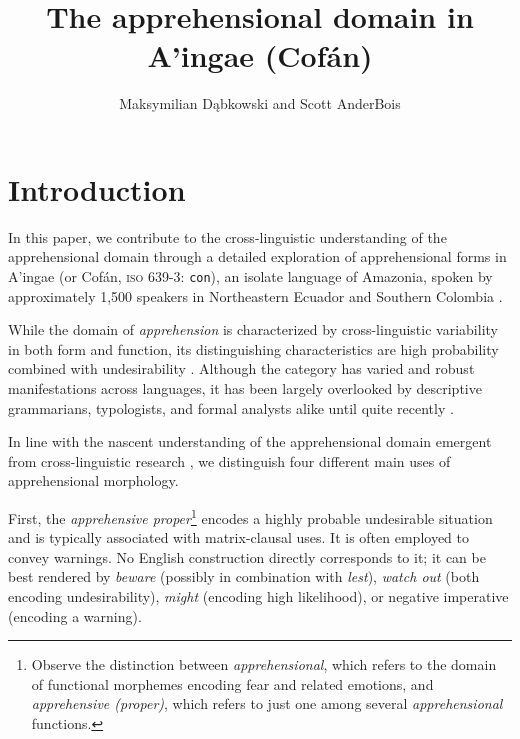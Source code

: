 \documentclass[output=paper,colorlinks,citecolor=brown]{langscibook}
\author{Maksymilian Dąbkowski\affiliation{University of California, Berkeley} and Scott AnderBois\affiliation{Brown University}}
\title{The apprehensional domain in A'ingae (Cofán)}
\begin{document}


\maketitle




\section{Introduction}
\label{sec:introduction}

In this paper, we contribute to the cross-linguistic understanding of the apprehensional domain through a detailed exploration of apprehensional forms in A'ingae (or Cofán, {\textsc{iso} 639-3}: \texttt{con}), an isolate language of Amazonia, spoken by approximately 1,500 speakers in Northeastern Ecuador and Southern Colombia \citep{dabkowski2021ldd}.

While the domain of \textit{apprehension} is characterized by cross-linguistic variability in both form and function, its distinguishing characteristics are high probability combined with undesirability \citep{vuillermet2018a}. Although the category has varied and robust manifestations across languages, it has been largely overlooked by descriptive grammarians, typologists, and formal analysts alike until quite recently
\citep[for extant descriptions, see][]{lichtenberk1995apprehensional, green1989marrithiyel, francois2003semantique, dobrushina2006grammatical, pakendorf2007possibility, angelo2016beware, vuillermet2018a}.

In line with the nascent understanding of the apprehensional domain emergent from cross-linguistic research \citep{VuillermetM2018questionnaire}, we distinguish four different main uses of apprehensional morphology.

First, the \emph{apprehensive proper}\footnote{Observe the distinction between \textit{apprehensional}, which refers to the domain of functional morphemes encoding fear and related emotions, and \textit{apprehensive (proper)}, which refers to just one among several \textit{apprehensional} functions.} encodes a highly probable undesirable situation and is typically associated with matrix-clausal uses. It is often employed to convey warnings. No English construction directly corresponds to it; it can be best rendered by \emph{beware} (possibly in combination with \emph{lest}), \emph{watch out} (both encoding undesirability), \emph{might} (encoding high likelihood), or negative imperative (encoding a warning).
\end{document}
